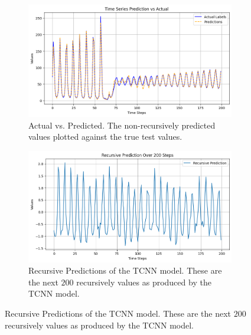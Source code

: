 \documentclass[conference]{IEEEtran}
\begin{document}
\begin{figure}[H]        
    \begin{subfigure}{0.45\textwidth}
        \includegraphics[scale=0.8]{pictures/actual_vs_pred.png}
        \caption{Actual vs. Predicted. The non-recursively predicted values plotted against the
        true test values.}
    \end{subfigure}
    
    \vspace{0.5cm} %
    
    \begin{subfigure}{0.45\textwidth}
        \includegraphics[scale=0.8]{pictures/recursive_predictions.png}
        \caption{Recursive Predictions of the TCNN model. These are the next $200$ recursively
        values as produced by the TCNN model.}
    \end{subfigure}
\end{figure}
\end{document}
